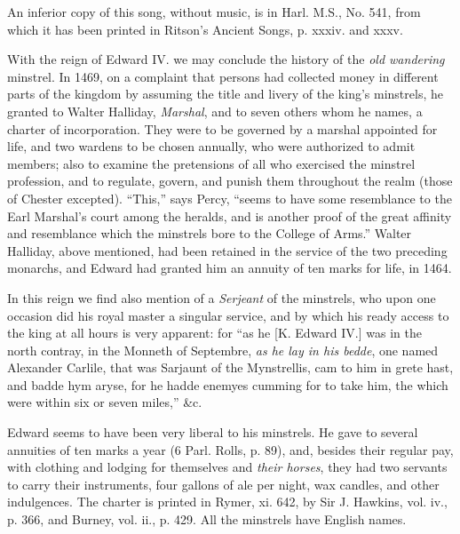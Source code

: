 An inferior copy of this song, without music, is in Harl. M.S., No. 541, from
which it has been printed in Ritson’s Ancient Songs, p. xxxiv. and xxxv.

With the reign of Edward IV. we may conclude the history of the \textit{old wandering}
minstrel. In 1469, on a complaint that persons had collected money in different
parts of the kingdom by assuming the title and livery of the king’s minstrels, he
granted to Walter Halliday, \textit{Marshal}, and to seven others whom he names,
a charter of incorporation. They were to be governed by a marshal appointed for
life, and two wardens to be chosen annually, who were authorized to admit members; 
also to examine the pretensions of all who exercised the minstrel profession,
and to regulate, govern, and punish them \pagebreak
 throughout the realm (those of Chester
excepted). “This,” says Percy, “seems to have some resemblance to the Earl
Marshal’s court among the heralds, and is another proof of the great affinity and
resemblance which the minstrels bore to the College of Arms.” Walter Halliday,
above mentioned, had been retained in the service of the two preceding monarchs,
and Edward had granted him an annuity of ten marks for life, in 1464.

In this reign we find also mention of a \textit{Serjeant} of the minstrels, who upon
one occasion did his royal master a singular service, and by which his ready access
to the king at all hours is very apparent: for “as he [K. Edward IV.] was in
the north contray, in the Monneth of Septembre, \textit{as he lay in his bedde}, one
named Alexander Carlile, that was Sarjaunt of the Mynstrellis, cam to him
in grete hast, and badde hym aryse, for he hadde enemyes cumming for to take
him, the which were within six or seven miles,” \&c.

Edward seems to have been very liberal to his minstrels. He gave to several
annuities of ten marks a year (6 Parl. Rolls, p. 89), and, besides their
regular pay, with clothing and lodging for themselves and \textit{their horses}, they had
two servants to carry their instruments, four gallons of ale per night, wax candles,
and other indulgences. The charter is printed in Rymer, xi. 642, by Sir
J. Hawkins, vol. iv., p. 366, and Burney, vol. ii., p. 429. All the minstrels
have English names.

